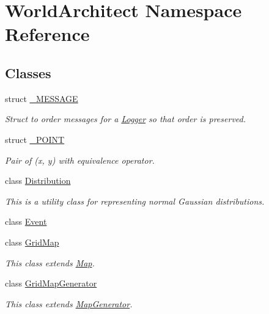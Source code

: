 \hypertarget{namespace_world_architect}{}\section{World\+Architect Namespace Reference}
\label{namespace_world_architect}
\subsection*{Classes}
\begin{DoxyCompactItemize}
\item 
struct \mbox{\hyperlink{struct_world_architect_1_1___m_e_s_s_a_g_e}{\+\_\+\+M\+E\+S\+S\+A\+GE}}
\begin{DoxyCompactList}\small\item\em Struct to order messages for a \mbox{\hyperlink{class_world_architect_1_1_logger}{Logger}} so that order is preserved. \end{DoxyCompactList}\item 
struct \mbox{\hyperlink{struct_world_architect_1_1___p_o_i_n_t}{\+\_\+\+P\+O\+I\+NT}}
\begin{DoxyCompactList}\small\item\em Pair of (x, y) with equivalence operator. \end{DoxyCompactList}\item 
class \mbox{\hyperlink{class_world_architect_1_1_distribution}{Distribution}}
\begin{DoxyCompactList}\small\item\em This is a utility class for representing normal Gaussian distributions. \end{DoxyCompactList}\item 
class \mbox{\hyperlink{class_world_architect_1_1_event}{Event}}
\item 
class \mbox{\hyperlink{class_world_architect_1_1_grid_map}{Grid\+Map}}
\begin{DoxyCompactList}\small\item\em This class extends \mbox{\hyperlink{class_world_architect_1_1_map}{Map}}. \end{DoxyCompactList}\item 
class \mbox{\hyperlink{class_world_architect_1_1_grid_map_generator}{Grid\+Map\+Generator}}
\begin{DoxyCompactList}\small\item\em This class extends \mbox{\hyperlink{class_world_architect_1_1_map_generator}{Map\+Generator}}. \end{DoxyCompactList}\item 

\end{DoxyCompactItemize}

